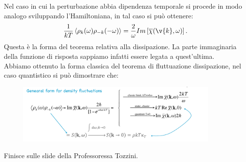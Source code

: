 Nel caso in cui la perturbazione abbia dipendenza temporale si procede in modo analogo sviluppando l'Hamiltoniana, in tal caso si può ottenere:
\[
    \frac{1}{kT}\left<\rho_k(\omega) \rho_{-k}(-\omega)\right> 
    =
    \frac{2}{\omega}Im\left[\overline{\chi}(\v{k},\omega)\right]
.\] 
Questa è la forma del teorema relativa alla dissipazione. La parte immaginaria della funzione di risposta sappiamo infatti essere legata a quest'ultima.\\
Abbiamo ottenuto la forma classica del teorema di fluttuazione dissipazione, nel caso quantistico si può dimostrare che:
\begin{figure}[H]
    \centering
    \includegraphics[width=0.9\textwidth]{figures/FluttuDiss-quantistico.png}
    \label{fig:figures-FluttuDiss-quantistico-png}
\end{figure}
Finisce sulle slide della Professoressa Tozzini.
